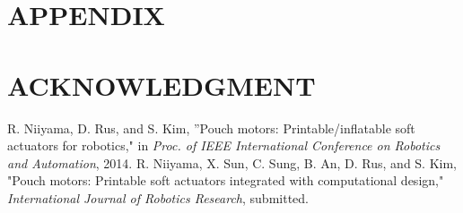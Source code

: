 \documentclass[letterpaper, 10 pt, conference]{ieeeconf}  %
\begin{document}
\addtolength{\textheight}{-12cm}   %







\section*{APPENDIX}



\section*{ACKNOWLEDGMENT}


\begin{thebibliography}{99}

 R. Niiyama, D. Rus, and S. Kim, ''Pouch motors: Printable/inflatable soft actuators for robotics," in \textit{Proc. of IEEE International Conference on Robotics and Automation}, 2014.
 R. Niiyama, X. Sun, C. Sung, B. An, D. Rus, and S. Kim, "Pouch motors: Printable soft actuators integrated with computational design," \textit{International Journal of Robotics Research}, submitted.

\end{thebibliography}
\end{document}
